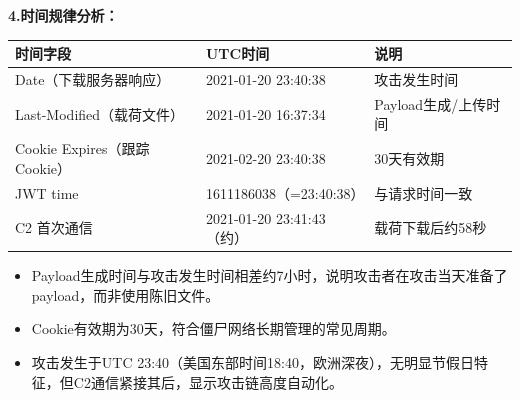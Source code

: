 \documentclass[12pt]{ctexart}
\begin{document}
	\vspace*{\baselineskip}
	\textbf{4.时间规律分析：}\\
	\begin{minipage}{\linewidth}
		\centering
		\begin{tabular}{lll}
			\toprule
			时间字段 & UTC时间 & 说明 \\
			\midrule
			Date（下载服务器响应） & 2021-01-20 23:40:38 & 攻击发生时间 \\
			Last-Modified（载荷文件） & 2021-01-20 16:37:34 & Payload生成/上传时间 \\
			Cookie Expires（跟踪Cookie） & 2021-02-20 23:40:38 & 30天有效期 \\
			JWT time & 1611186038（=23:40:38） & 与请求时间一致 \\
			C2 首次通信 & 2021-01-20 23:41:43（约） & 载荷下载后约58秒 \\
			\bottomrule
		\end{tabular}
	\end{minipage}
	\begin{itemize}
		\item Payload生成时间与攻击发生时间相差约7小时，说明攻击者在攻击当天准备了payload，而非使用陈旧文件。
		\item Cookie有效期为30天，符合僵尸网络长期管理的常见周期。
		\item 攻击发生于UTC 23:40（美国东部时间18:40，欧洲深夜），无明显节假日特征，但C2通信紧接其后，显示攻击链高度自动化。
	\end{itemize}
\end{document}
